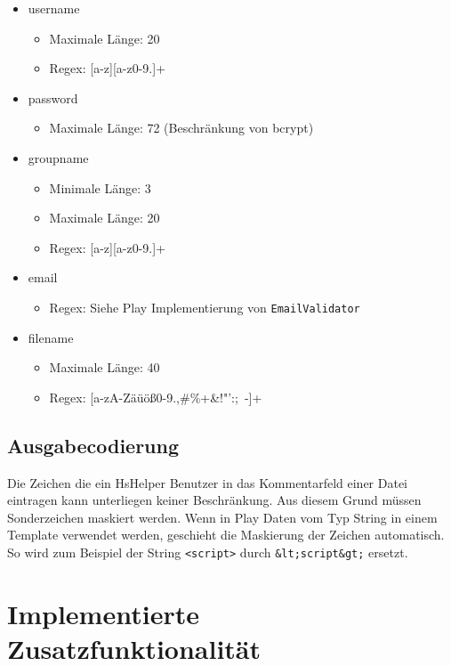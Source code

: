 \documentclass[12pt,DIV14,BCOR10mm,a4paper,parskip=half-,headsepline,headinclude,english,ngerman,bibliography=totocnumbered]{scrreprt}
\begin{document}
\begin{itemize}
	\item username
	 \begin{itemize}
			\item Maximale Länge: 20
			\item Regex: [a-z][a-z0-9.]+
		\end{itemize}


	\item password
	\begin{itemize}
		\item Maximale Länge: 72 (Beschränkung von bcrypt)
	\end{itemize}

	\item groupname
	\begin{itemize}
		\item Minimale Länge: 3
		\item Maximale Länge: 20
		\item Regex: [a-z][a-z0-9.]+

	\end{itemize}


	\item email
	\begin{itemize}
		\item Regex: Siehe Play Implementierung von \texttt{EmailValidator}
	\end{itemize}
	
	\item filename
	\begin{itemize}
		\item Maximale Länge: 40
		\item Regex: [a-zA-Zäüöß0-9.,#\%+&!"':;~-]+ 
	\end{itemize}

\end{itemize}

\section{Ausgabecodierung}
Die Zeichen die ein HsHelper Benutzer in das Kommentarfeld einer Datei eintragen kann unterliegen keiner Beschränkung. Aus diesem Grund müssen Sonderzeichen maskiert werden. Wenn in Play Daten vom Typ String in einem Template verwendet werden, geschieht die Maskierung der Zeichen automatisch. So wird zum Beispiel der String \texttt{<script>} durch \texttt{\&lt;script\&gt;} ersetzt.



\chapter{Implementierte Zusatzfunktionalität}
\end{document}
